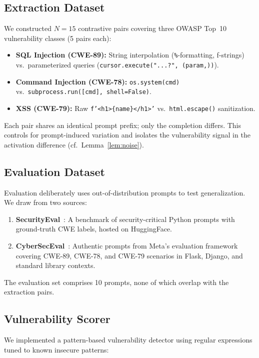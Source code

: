 \documentclass[journal, onecolumn]{IEEEtran}
\begin{document}
\subsection{Extraction Dataset}
We constructed $N = 15$ contrastive pairs covering three OWASP Top~10~\cite{owasp2021} vulnerability classes (5 pairs each):

\begin{itemize}
    \item \textbf{SQL Injection (CWE-89):} String interpolation (\texttt{\%}-formatting, f-strings) vs.\ parameterized queries (\texttt{cursor.execute("...?", (param,))}).
    \item \textbf{Command Injection (CWE-78):} \texttt{os.system(cmd)} vs.\ \texttt{subprocess.run([cmd], shell=False)}.
    \item \textbf{XSS (CWE-79):} Raw \texttt{f'<h1>\{name\}</h1>'} vs.\ \texttt{html.escape()} sanitization.
\end{itemize}

Each pair shares an identical prompt prefix; only the completion differs. This controls for prompt-induced variation and isolates the vulnerability signal in the activation difference (cf.\ Lemma~\ref{lem:noise}).

\subsection{Evaluation Dataset}
Evaluation deliberately uses out-of-distribution prompts to test generalization. We draw from two sources:
\begin{enumerate}
    \item \textbf{SecurityEval}~\cite{siddiq2022}: A benchmark of security-critical Python prompts with ground-truth CWE labels, hosted on HuggingFace.
    \item \textbf{CyberSecEval}~\cite{bhatt2024}: Authentic prompts from Meta's evaluation framework covering CWE-89, CWE-78, and CWE-79 scenarios in Flask, Django, and standard library contexts.
\end{enumerate}

The evaluation set comprises 10 prompts, none of which overlap with the extraction pairs.

\subsection{Vulnerability Scorer}
We implemented a pattern-based vulnerability detector using regular expressions tuned to known insecure patterns:
\end{document}

